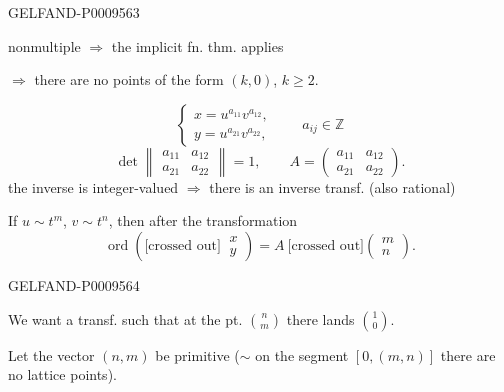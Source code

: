 \begin{GelfandAdjacentEvidence}{GELFAND-P000956}{3}

nonmultiple $\Rightarrow$ the implicit fn. thm. applies

$\Rightarrow$ there are no points of the form $(k,0)$, $k\geqslant2$.

\begin{equation*}
 \begin{cases}
 x=u^{a_{11}}v^{a_{12}},\\
 y=u^{a_{21}}v^{a_{22}},
 \end{cases}
 \qquad a_{ij}\in\mathbb Z
 \tag{7}
\end{equation*}
\begin{equation*}
 \det\begin{Vmatrix}a_{11}&a_{12}\\a_{21}&a_{22}\end{Vmatrix}=1,
 \qquad A=\begin{pmatrix}a_{11}&a_{12}\\a_{21}&a_{22}\end{pmatrix}.
 \tag{8}
\end{equation*}
the inverse is integer-valued $\Rightarrow$ there is an inverse transf. (also rational)

If $u\sim t^m$, $v\sim t^n$, then after the transformation
\begin{equation*}
 \operatorname{ord}\left(\text{[crossed out]}\ \begin{matrix}x\\y\end{matrix}\right)
 =A\ \text{[crossed out]}\begin{pmatrix}m\\n\end{pmatrix}.
 \tag{9}
\end{equation*}
\end{GelfandAdjacentEvidence}
\begin{GelfandAdjacentEvidence}{GELFAND-P000956}{4}


We want a transf. such that at the pt. $\binom{n}{m}$ there lands $\binom{1}{0}$.

Let the vector $(n,m)$ be primitive ($\sim$ on the segment $[0,(m,n)]$ there are no lattice points).
\end{GelfandAdjacentEvidence}
